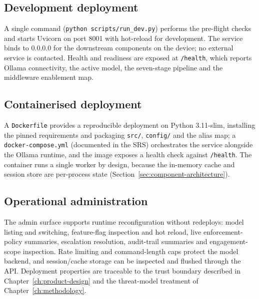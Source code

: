 \subsection*{Development deployment}

A single command (\texttt{python scripts/run\_dev.py}) performs the pre-flight
checks and starts Uvicorn on port 8001 with hot-reload for development. The
service binds to 0.0.0.0 for the downstream components on the device; no
external service is contacted. Health and readiness are exposed at
\texttt{/health}, which reports Ollama connectivity, the active model, the
seven-stage pipeline and the middleware enablement map.

\subsection*{Containerised deployment}

A \texttt{Dockerfile} provides a reproducible deployment on Python 3.11-slim,
installing the pinned requirements and packaging \texttt{src/}, \texttt{config/}
and the alias map; a \texttt{docker-compose.yml} (documented in the SRS)
orchestrates the service alongside the Ollama runtime, and the image exposes a
health check against \texttt{/health}. The container runs a single worker by
design, because the in-memory cache and session store are per-process state
(Section~\ref{sec:component-architecture}).

\subsection*{Operational administration}

The admin surface supports runtime reconfiguration without redeploys: model
listing and switching, feature-flag inspection and hot reload, live
enforcement-policy summaries, escalation resolution, audit-trail summaries and
engagement-scope inspection. Rate limiting and command-length caps protect the
model backend, and session/cache storage can be inspected and flushed through
the API. Deployment properties are traceable to the trust boundary described
in Chapter~\ref{ch:product-design} and the threat-model treatment of
Chapter~\ref{ch:methodology}.